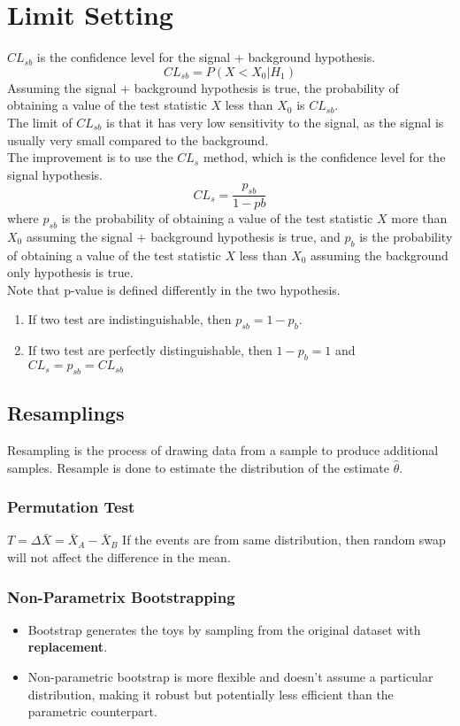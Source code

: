 \documentclass[12pt,a4paper]{article}
\begin{document}
\section{Limit Setting}
$CL_{sb}$ is the confidence level for the signal + background hypothesis.
$$
CL_{sb} = P(X<X_0|H_1)
$$
Assuming the signal + background hypothesis is true, the probability of obtaining a value of the test statistic $X$ less than $X_0$ is $CL_{sb}$.\\
The limit of $CL_{sb}$ is that it has very low sensitivity to the signal, as the signal is usually very small compared to the background.\\
The improvement is to use the $CL_s$ method, which is the confidence level for the signal hypothesis.
$$
CL_s = \frac{p_{sb}}{1-p{b}}
$$
where $p_{sb}$ is the probability of obtaining a value of the test statistic $X$ more than $X_0$ assuming the signal + background hypothesis is true, and $p_b$ is the probability of obtaining a value of the test statistic $X$ less than $X_0$ assuming the background only hypothesis is true.\\
Note that p-value is defined differently in the two hypothesis.
\begin{enumerate}
    \item If two test are indistinguishable, then $p_{sb} = 1 - p_b$.
    \item If two test are perfectly distinguishable, then $1-p_b =1 $ and $CL_{s} = p_{sb} = CL_{sb}$
\end{enumerate}
\subsection{Resamplings}
Resampling is the process of drawing data from a sample to produce additional samples.
Resample is done to estimate the distribution of the estimate $\hat{\theta}$.
\subsubsection{Permutation Test}
$T=\Delta \bar{X}=\bar{X}_A-\bar{X}_B$
If the events are from same distribution, then random swap will not affect the difference in the mean.\\
\subsubsection{Non-Parametrix Bootstrapping}
\begin{itemize}
    \item Bootstrap generates the toys by sampling from the original dataset with \textbf{replacement}.
    \item Non-parametric bootstrap is more flexible and doesn't assume a particular distribution, making it robust but potentially less efficient than the parametric counterpart.
\end{itemize}
\end{document}
